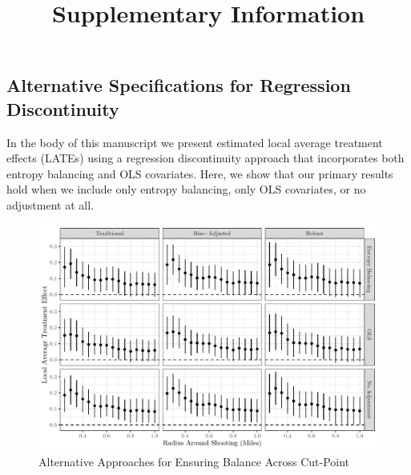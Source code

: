 \documentclass[
  12pt,
]{article}
\title{Supplementary Information}
\author{}
\date{\vspace{-2.5em}}
\begin{document}
\maketitle

{
\setcounter{tocdepth}{2}
\tableofcontents
}
\newpage
\doublespacing
\setcounter{table}{0}  \renewcommand{\thetable}{A\arabic{table}} \setcounter{figure}{0} \renewcommand{\thefigure}{A\arabic{figure}}
\newpage

\hypertarget{alternative-specifications-for-regression-discontinuity}{%
\subsection*{Alternative Specifications for Regression Discontinuity}\label{alternative-specifications-for-regression-discontinuity}}

In the body of this manuscript we present estimated local average treatment effects (LATEs) using a regression discontinuity approach that incorporates both entropy balancing and OLS covariates. Here, we show that our primary results hold when we include only entropy balancing, only OLS covariates, or no adjustment at all.

\begin{figure}[!ht]

{\centering \includegraphics{si_files/figure-latex/alt-proc-1} 

}

\caption{\label{fig:alt-bal}Alternative Approaches for Ensuring Balance Across Cut-Point}\label{fig:alt-proc}
\end{figure}
\end{document}
